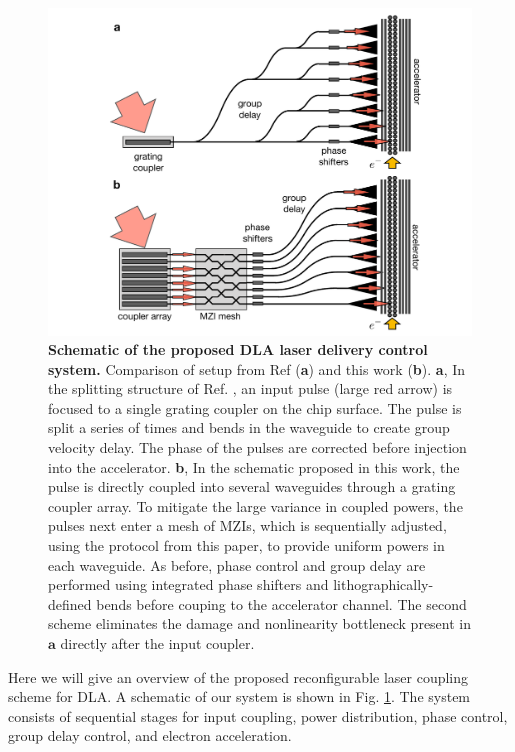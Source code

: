 \begin{figure}
\centering
\includegraphics[width=\columnwidth]{figures/MZI_direct}
\caption{\label{fig:setup} \textbf{Schematic of the proposed DLA laser delivery control system.}  Comparison of setup from Ref \cite{hughes_-chip_2018} (\textbf{a}) and this work (\textbf{b}).  \textbf{a}, In the splitting structure of Ref. \cite{hughes_-chip_2018}, an input pulse (large red arrow) is focused to a single grating coupler on the chip surface.  The pulse is split a series of times and bends in the waveguide to create group velocity delay.  The phase of the pulses are corrected before injection into the accelerator.  \textbf{b}, In the schematic proposed in this work, the pulse is directly coupled into several waveguides through a grating coupler array. To mitigate the large variance in coupled powers, the pulses next enter a mesh of MZIs, which is sequentially adjusted, using the protocol from this paper, to provide uniform powers in each waveguide.  As before, phase control and group delay are performed using integrated phase shifters and lithographically-defined bends before couping to the accelerator channel.  The second scheme eliminates the damage and nonlinearity bottleneck present in $\textbf{a}$ directly after the input coupler.}
\end{figure}

Here we will give an overview of the proposed reconfigurable laser coupling scheme for DLA.  A schematic of our system is shown in Fig. \ref{fig:setup}.  The system consists of sequential stages for input coupling, power distribution, phase control, group delay control, and electron acceleration. 


